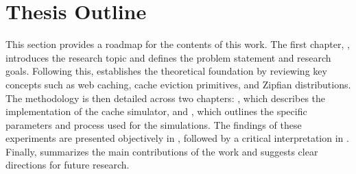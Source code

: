 


\section{Thesis Outline}

This section provides a roadmap for the contents of this work. The first chapter, , introduces the research topic and defines the problem statement and research goals. Following this,  establishes the theoretical foundation by reviewing key concepts such as web caching, cache eviction primitives, and Zipfian distributions. The methodology is then detailed across two chapters: , which describes the implementation of the cache simulator, and , which outlines the specific parameters and process used for the simulations. The findings of these experiments are presented objectively in , followed by a critical interpretation in . Finally,  summarizes the main contributions of the work and suggests clear directions for future research.